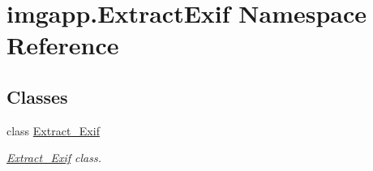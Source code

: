 \hypertarget{namespaceimgapp_1_1ExtractExif}{}\section{imgapp.\+Extract\+Exif Namespace Reference}
\label{namespaceimgapp_1_1ExtractExif}
\subsection*{Classes}
\begin{DoxyCompactItemize}
\item 
class \hyperlink{classimgapp_1_1ExtractExif_1_1Extract__Exif}{Extract\+\_\+\+Exif}
\begin{DoxyCompactList}\small\item\em \hyperlink{classimgapp_1_1ExtractExif_1_1Extract__Exif}{Extract\+\_\+\+Exif} class. \end{DoxyCompactList}\end{DoxyCompactItemize}
